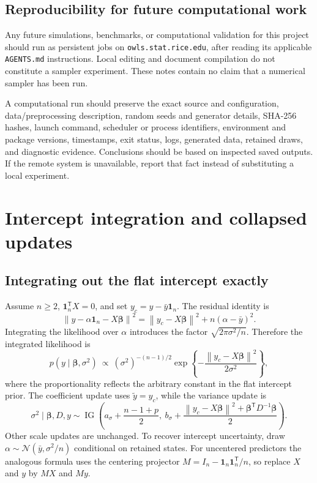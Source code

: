 \documentclass[11pt,letterpaper]{article}
\numberwithin{equation}{section}
\newcommand{\IG}{\operatorname{IG}}
\newcommand{\Normal}{\mathcal{N}}
\newcommand{\given}{\mid}
\newcommand{\bbeta}{\bm{\beta}}
\newcommand{\ones}{\mathbf{1}}
\newcommand{\trans}{^{\mathsf T}}
\newcommand{\norm}[1]{\left\lVert#1\right\rVert}
\begin{document}
\subsection{Reproducibility for future computational work}

Any future simulations, benchmarks, or computational validation for this
project should run as persistent jobs on \texttt{owls.stat.rice.edu}, after
reading its applicable \texttt{AGENTS.md} instructions. Local editing and
document compilation do not constitute a sampler experiment. These notes
contain no claim that a numerical sampler has been run.

A computational run should preserve the exact source and configuration,
data/preprocessing description, random seeds and generator details, SHA-256
hashes, launch command, scheduler or process identifiers, environment and
package versions, timestamps, exit status, logs, generated data, retained
draws, and diagnostic evidence. Conclusions should be based on inspected
saved outputs. If the remote system is unavailable, report that fact instead
of substituting a local experiment.

\appendix
\clearpage
\section{Intercept integration and collapsed updates}\label{app:intercept}

\subsection{Integrating out the flat intercept exactly}

Assume \(n\geq2\), \(\ones_n\trans X=0\), and set
\(y_c=y-\bar y\ones_n\). The residual identity is
\[
 \norm{y-\alpha\ones_n-X\bbeta}^2
 =\norm{y_c-X\bbeta}^2+n(\alpha-\bar y)^2.
\]
Integrating the likelihood over \(\alpha\) introduces the factor
\(\sqrt{2\pi\sigma^2/n}\). Therefore the integrated likelihood is
\begin{equation}
 p(y\given\bbeta,\sigma^2)\ \propto\
 (\sigma^2)^{-(n-1)/2}
 \exp\left\{-\frac{\norm{y_c-X\bbeta}^2}{2\sigma^2}\right\},
\end{equation}
where the proportionality reflects the arbitrary constant in the flat
intercept prior. The coefficient update uses \(\widetilde y=y_c\), while
the variance update is
\begin{equation}\label{eq:integratedalpha}
 \sigma^2\given\bbeta,D,y\sim
 \IG\left(a_\sigma+\frac{n-1+p}{2},\ b_\sigma+
           \frac{\norm{y_c-X\bbeta}^2+\bbeta\trans D^{-1}\bbeta}{2}\right).
\end{equation}
Other scale updates are unchanged. To recover intercept uncertainty, draw
\(\alpha\sim\Normal(\bar y,\sigma^2/n)\) conditional on retained states.
For uncentered predictors the analogous formula uses the centering projector
\(M=I_n-\ones_n\ones_n\trans/n\), so replace \(X\) and \(y\) by
\(MX\) and \(My\).
\end{document}
